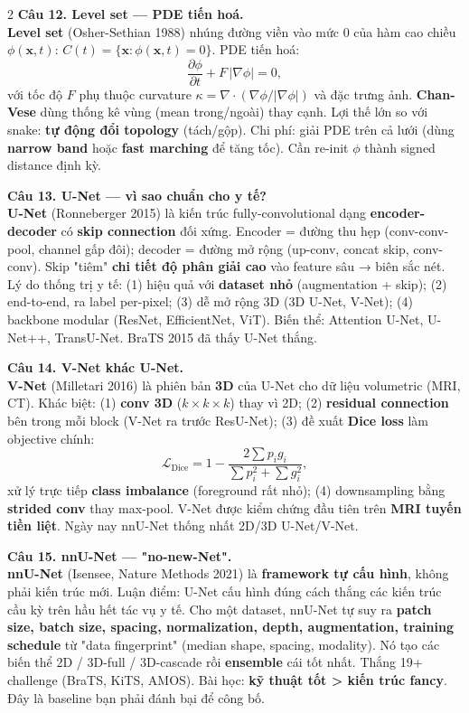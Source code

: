 \begin{paracol}{2}
\textbf{Câu 12. Level set — PDE tiến hoá.}\\
\textbf{Level set} (Osher-Sethian 1988) nhúng đường viền vào mức 0 của hàm cao chiều $\phi(\mathbf{x},t)$: $C(t)=\{\mathbf{x}:\phi(\mathbf{x},t)=0\}$. PDE tiến hoá:
\[\frac{\partial\phi}{\partial t}+F\,|\nabla\phi|=0,\]
với tốc độ $F$ phụ thuộc curvature $\kappa=\nabla\!\cdot\!(\nabla\phi/|\nabla\phi|)$ và đặc trưng ảnh. \textbf{Chan-Vese} dùng thống kê vùng (mean trong/ngoài) thay cạnh. Lợi thế lớn so với snake: \textbf{tự động đổi topology} (tách/gộp). Chi phí: giải PDE trên cả lưới (dùng \textbf{narrow band} hoặc \textbf{fast marching} để tăng tốc). Cần re-init $\phi$ thành signed distance định kỳ.

\textbf{Câu 13. U-Net — vì sao chuẩn cho y tế?}\\
\textbf{U-Net} (Ronneberger 2015) là kiến trúc fully-convolutional dạng \textbf{encoder-decoder} có \textbf{skip connection} đối xứng. Encoder = đường thu hẹp (conv-conv-pool, channel gấp đôi); decoder = đường mở rộng (up-conv, concat skip, conv-conv). Skip "tiêm" \textbf{chi tiết độ phân giải cao} vào feature sâu → biên sắc nét. Lý do thống trị y tế: (1) hiệu quả với \textbf{dataset nhỏ} (augmentation + skip); (2) end-to-end, ra label per-pixel; (3) dễ mở rộng 3D (3D U-Net, V-Net); (4) backbone modular (ResNet, EfficientNet, ViT). Biến thể: Attention U-Net, U-Net++, TransU-Net. BraTS 2015 đã thấy U-Net thắng.

\textbf{Câu 14. V-Net khác U-Net.}\\
\textbf{V-Net} (Milletari 2016) là phiên bản \textbf{3D} của U-Net cho dữ liệu volumetric (MRI, CT). Khác biệt: (1) \textbf{conv 3D} ($k\times k\times k$) thay vì 2D; (2) \textbf{residual connection} bên trong mỗi block (V-Net ra trước ResU-Net); (3) đề xuất \textbf{Dice loss} làm objective chính:
\[\mathcal{L}_{\text{Dice}}=1-\frac{2\sum p_i g_i}{\sum p_i^2+\sum g_i^2},\]
xử lý trực tiếp \textbf{class imbalance} (foreground rất nhỏ); (4) downsampling bằng \textbf{strided conv} thay max-pool. V-Net được kiểm chứng đầu tiên trên \textbf{MRI tuyến tiền liệt}. Ngày nay nnU-Net thống nhất 2D/3D U-Net/V-Net.

\textbf{Câu 15. nnU-Net — "no-new-Net".}\\
\textbf{nnU-Net} (Isensee, Nature Methods 2021) là \textbf{framework tự cấu hình}, không phải kiến trúc mới. Luận điểm: U-Net cấu hình đúng cách thắng các kiến trúc cầu kỳ trên hầu hết tác vụ y tế. Cho một dataset, nnU-Net tự suy ra \textbf{patch size, batch size, spacing, normalization, depth, augmentation, training schedule} từ "data fingerprint" (median shape, spacing, modality). Nó tạo các biến thể 2D / 3D-full / 3D-cascade rồi \textbf{ensemble} cái tốt nhất. Thắng 19+ challenge (BraTS, KiTS, AMOS). Bài học: \textbf{kỹ thuật tốt > kiến trúc fancy}. Đây là baseline bạn phải đánh bại để công bố.


\end{paracol}
